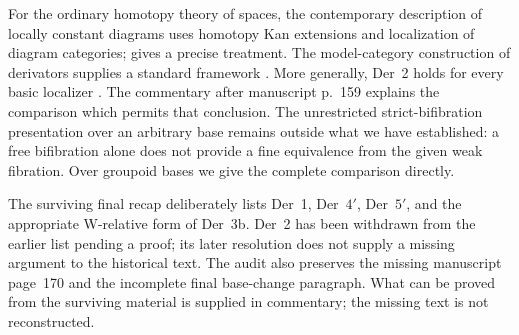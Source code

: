 For the ordinary homotopy theory of spaces, the contemporary description of locally constant diagrams uses homotopy Kan extensions and localization of diagram categories; \citet{Cisinski2009LocallyConstant} gives a precise treatment. The model-category construction of derivators supplies a standard framework \citep{Cisinski2003,Groth2013}. More generally, Der~2 holds for every basic localizer \citep[Propositions~3.1.30 and~4.2.7]{Cisinski2006}. The commentary after manuscript p.~159 explains the comparison which permits that conclusion. The unrestricted strict-bifibration presentation over an arbitrary base remains outside what we have established: a free bifibration alone does not provide a fine equivalence from the given weak fibration. Over groupoid bases we give the complete comparison directly.

The surviving final recap deliberately lists Der~1, Der~$4'$, Der~$5'$, and the appropriate W-relative form of Der~3b. Der~2 has been withdrawn from the earlier list pending a proof; its later resolution does not supply a missing argument to the historical text. The audit also preserves the missing manuscript page~170 and the incomplete final base-change paragraph. What can be proved from the surviving material is supplied in commentary; the missing text is not reconstructed.
